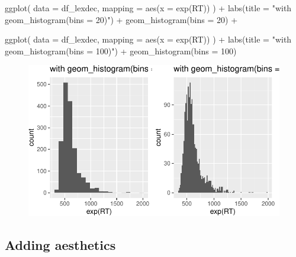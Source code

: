 \documentclass[
  letterpaper,
  DIV=11]{scrartcl}
\newenvironment{Shaded}{\begin{snugshade}}{\end{snugshade}}
\newcommand{\AttributeTok}[1]{\textcolor[rgb]{0.40,0.45,0.13}{#1}}
\newcommand{\DecValTok}[1]{\textcolor[rgb]{0.68,0.00,0.00}{#1}}
\newcommand{\FunctionTok}[1]{\textcolor[rgb]{0.28,0.35,0.67}{#1}}
\newcommand{\NormalTok}[1]{\textcolor[rgb]{0.00,0.23,0.31}{#1}}
\newcommand{\SpecialCharTok}[1]{\textcolor[rgb]{0.37,0.37,0.37}{#1}}
\newcommand{\StringTok}[1]{\textcolor[rgb]{0.13,0.47,0.30}{#1}}
\theoremstyle{definition}
\theoremstyle{remark}
\begin{document}
\begin{Shaded}
\begin{Highlighting}[]
\FunctionTok{ggplot}\NormalTok{(}
  \AttributeTok{data =}\NormalTok{ df\_lexdec,}
  \AttributeTok{mapping =} \FunctionTok{aes}\NormalTok{(}\AttributeTok{x =} \FunctionTok{exp}\NormalTok{(RT))}
\NormalTok{) }\SpecialCharTok{+}
  \FunctionTok{labs}\NormalTok{(}\AttributeTok{title =} \StringTok{"with geom\_histogram(bins = 20)"}\NormalTok{) }\SpecialCharTok{+}
  \FunctionTok{geom\_histogram}\NormalTok{(}\AttributeTok{bins =} \DecValTok{20}\NormalTok{) }\SpecialCharTok{+}

  \FunctionTok{ggplot}\NormalTok{(}
  \AttributeTok{data =}\NormalTok{ df\_lexdec,}
  \AttributeTok{mapping =} \FunctionTok{aes}\NormalTok{(}\AttributeTok{x =} \FunctionTok{exp}\NormalTok{(RT))}
\NormalTok{) }\SpecialCharTok{+}
  \FunctionTok{labs}\NormalTok{(}\AttributeTok{title =} \StringTok{"with geom\_histogram(bins = 100)"}\NormalTok{) }\SpecialCharTok{+}
  \FunctionTok{geom\_histogram}\NormalTok{(}\AttributeTok{bins =} \DecValTok{100}\NormalTok{)}
\end{Highlighting}
\end{Shaded}

\begin{figure}[H]

{\centering \includegraphics{_intro_r_slides_files/figure-pdf/unnamed-chunk-19-1.pdf}

}

\end{figure}

\hypertarget{adding-aesthetics}{%
\subsection{Adding aesthetics}\label{adding-aesthetics}}
\end{document}
